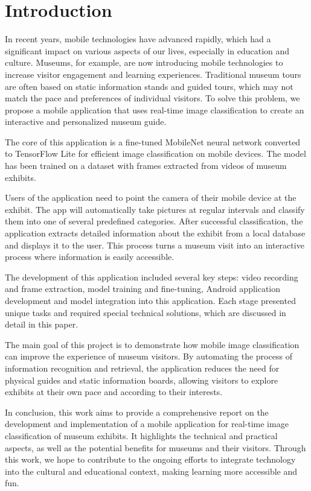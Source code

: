 \chapter*{Introduction}

In recent years, mobile technologies have advanced rapidly, which had a significant impact on various aspects of our lives, especially in education and culture. Museums, for example, are now introducing mobile technologies to increase visitor engagement and learning experiences. Traditional museum tours are often based on static information stands and guided tours, which may not match the pace and preferences of individual visitors. To solve this problem, we propose a mobile application that uses real-time image classification to create an interactive and personalized museum guide.

The core of this application is a fine-tuned MobileNet neural network converted to TensorFlow Lite for efficient image classification on mobile devices. The model has been trained on a dataset with frames extracted from videos of museum exhibits. 

Users of the application need to point the camera of their mobile device at the exhibit. The app will automatically take pictures at regular intervals and classify them into one of several predefined categories. After successful classification, the application extracts detailed information about the exhibit from a local database and displays it to the user. This process turns a museum visit into an interactive process where information is easily accessible.

The development of this application included several key steps: video recording and frame extraction, model training and fine-tuning, Android application development and model integration into this application. Each stage presented unique tasks and required special technical solutions, which are discussed in detail in this paper.

The main goal of this project is to demonstrate how mobile image classification can improve the experience of museum visitors. By automating the process of information recognition and retrieval, the application reduces the need for physical guides and static information boards, allowing visitors to explore exhibits at their own pace and according to their interests.

In conclusion, this work aims to provide a comprehensive report on the development and implementation of a mobile application for real-time image classification of museum exhibits. It highlights the technical and practical aspects, as well as the potential benefits for museums and their visitors. Through this work, we hope to contribute to the ongoing efforts to integrate technology into the cultural and educational context, making learning more accessible and fun.